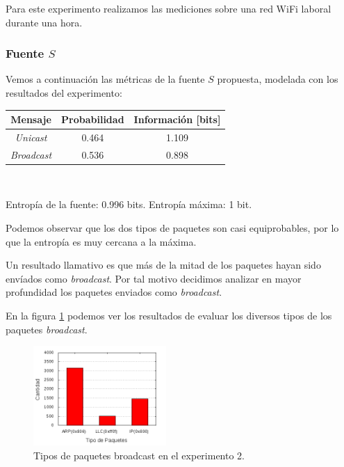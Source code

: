 \par Para este experimento realizamos las mediciones sobre una red WiFi laboral durante una hora.

\subsubsection{Fuente $S$}

\par Vemos a continuación las m\'etricas de la fuente $S$ propuesta, modelada con los resultados del experimento: \\

\begin{tabular}{ | c | c | c |}
    \hline
    Mensaje & Probabilidad & Información [bits] \\
    \hline
    \textit{Unicast} & 0.464 & 1.109 \\
    \hline
    \textit{Broadcast} & 0.536 & 0.898 \\
    \hline
\end{tabular} \\

\par Entropía de la fuente: 0.996 bits. Entropía máxima: 1 bit.

\par Podemos observar que los dos tipos de paquetes son casi equiprobables, por lo que la entropía es muy cercana a la máxima.

\par Un resultado llamativo es que m\'as de la mitad de los paquetes hayan sido env\'iados como \textit{broadcast}.
Por tal motivo decidimos analizar en mayor profundidad los paquetes enviados como \textit{broadcast}.

\par En la figura \ref{Tipos de paquetes} podemos ver los resultados de evaluar los diversos tipos de los paquetes \textit{broadcast}.

\begin{figure}[ht]
    \centering
    \includegraphics[width=0.45\textwidth]{figuras/experimento2-tipos-paquetes.png}
    \caption{Tipos de paquetes broadcast en el experimento 2.}\label{Tipos de paquetes}
\end{figure}

